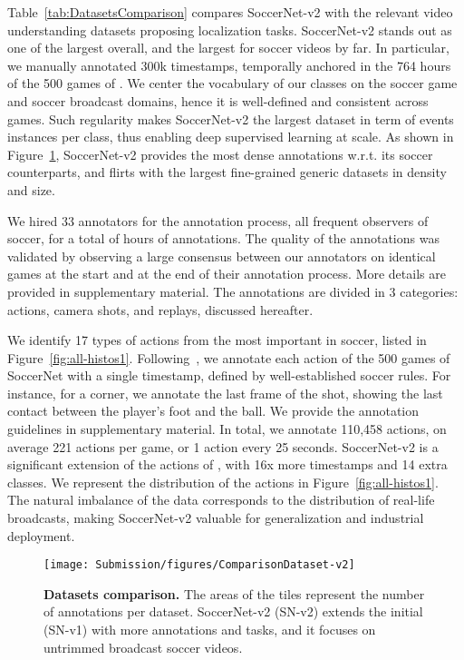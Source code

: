 \documentclass[final]{cvsports}
\begin{document}
 
 Table~\ref{tab:DatasetsComparison} compares SoccerNet-v2 with the relevant video understanding datasets proposing localization tasks.  
SoccerNet-v2 stands out as one of the largest overall, and the largest for soccer videos by far. 
In particular, we manually annotated \texttildelow 300k timestamps, temporally anchored in the 764 hours of the 500 games of \SoccerNet. We center the vocabulary of our classes on the soccer game and soccer broadcast domains, hence it is well-defined and consistent across games. Such regularity makes SoccerNet-v2 the largest dataset in term of events instances per class, thus enabling deep supervised learning at scale.
As shown in Figure~\ref{fig:datasets}, SoccerNet-v2 provides the most dense annotations w.r.t. its soccer counterparts, and flirts with the largest fine-grained generic datasets in density and size. 

We hired 33 annotators for the annotation process, all frequent observers of soccer, for a total of  hours of annotations. The quality of the annotations was validated by observing a large consensus between our annotators on identical games at the start and at the end of their annotation process. More details are provided in supplementary material. 
The annotations are divided in 3 categories: actions, camera shots, and replays, discussed hereafter. 


 We identify 17 types of actions from the most important in soccer, listed in Figure~\ref{fig:all-histos1}. Following~\cite{Giancola_2018_CVPR_Workshops}, we annotate each action of the 500 games of SoccerNet with a single timestamp, defined by well-established soccer rules. For instance, for a corner, we annotate the last frame of the shot, \ie showing the last contact between the player's foot and the ball. We provide the annotation guidelines in supplementary material. 
In total, we annotate 110,458 actions, on average 221 actions per game, or 1 action every 25 seconds.
SoccerNet-v2 is a significant extension of the actions of \SoccerNet, with 16x more timestamps and 14 extra classes. 
We represent the distribution of the actions in Figure~\ref{fig:all-histos1}. The natural imbalance of the data corresponds to the distribution of real-life broadcasts, making SoccerNet-v2 valuable for generalization and industrial deployment.



\begin{figure}
    \centering
    \texttt{[image: Submission/figures/ComparisonDataset-v2]}
    \caption{\textbf{Datasets comparison.} The areas of the tiles represent the number of annotations per dataset. SoccerNet-v2 (SN-v2) extends the initial \SoccerNet (SN-v1) with more annotations and tasks, and it focuses on untrimmed broadcast soccer videos.}
    \label{fig:datasets}
\end{figure}
\end{document}
